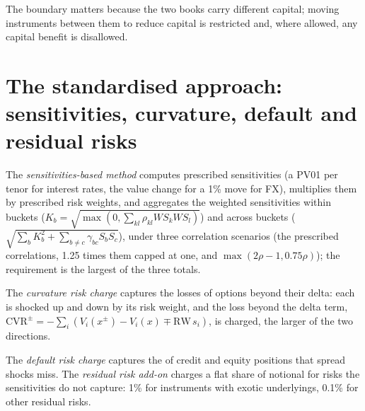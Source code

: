 The boundary matters because the two books carry different capital; moving instruments
between them to reduce capital is restricted and, where allowed, any capital benefit is
disallowed.

\section{The standardised approach: sensitivities, curvature, default and residual risks}

\begin{definition}\label{def:rc:regulatory-capital-for-trading-books:sbm}
The \emph{sensitivities-based method} computes prescribed
sensitivities (a PV01 per tenor for interest rates, the value change for a 1\% move for FX),
multiplies them by prescribed risk weights, and aggregates the weighted sensitivities within
buckets ($K_b = \sqrt{\max(0,\sum_{kl}\rho_{kl}WS_kWS_l)}$) and across buckets
($\sqrt{\sum_bK_b^2+\sum_{b\ne c}\gamma_{bc}S_bS_c}$), under three correlation scenarios (the prescribed
correlations, 1.25 times them capped at one, and $\max(2\rho-1,0.75\rho)$); the requirement is the
largest of the three totals.
\end{definition}

\begin{definition}\label{def:rc:regulatory-capital-for-trading-books:curv}
The \emph{curvature risk charge} captures the losses of options
beyond their delta: each  is shocked up and down by its risk weight, and the loss
beyond the delta term, $\mathrm{CVR}^\pm = -\sum_i(V_i(x^\pm)-V_i(x)\mp\mathrm{RW}\,s_i)$, is charged, the larger
of the two directions.
\end{definition}

\begin{definition}\label{def:rc:regulatory-capital-for-trading-books:drc}
The \emph{default risk charge} captures the  of
credit and equity positions that spread shocks miss. The \emph{residual risk
add-on} charges a flat share of notional for risks the
sensitivities do not capture: 1\% for instruments with exotic underlyings, 0.1\% for other
residual risks.
\end{definition}

